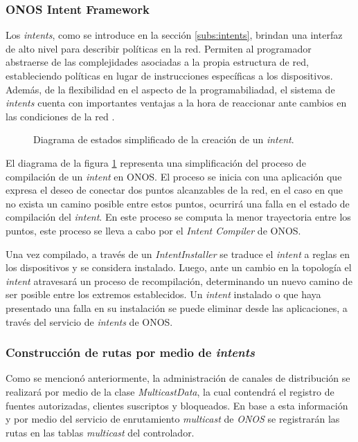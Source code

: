 \subsubsection*{ONOS Intent Framework}
Los \textit{intents}, como se introduce en la sección \ref{subs:intents}, brindan una interfaz de alto nivel para describir políticas en la red. Permiten al programador abstraerse de las complejidades asociadas a la propia estructura de red, estableciendo políticas en lugar de instrucciones específicas a los dispositivos. Además, de la flexibilidad en el aspecto de la programabiliadad, el sistema de \textit{intents} cuenta con importantes ventajas a la hora de reaccionar ante cambios en las condiciones de la red \parencite{onos_intent}. 

\begin{figure}[th]
	\centering 
	\caption[Diagrama de estados simplificado de la creación de un \textit{intent}]{Diagrama de estados simplificado de la creación de un \textit{intent}.}
	\label{fig:intent}
\end{figure}

El diagrama de la figura \ref{fig:intent} representa una simplificación del proceso de compilación de un \textit{intent} en ONOS. El proceso se inicia con una aplicación que expresa el deseo de conectar dos puntos alcanzables de la red, en el caso en que no exista un camino posible entre estos puntos, ocurrirá una falla en el estado de compilación del \textit{intent}. En este proceso se computa la menor trayectoria entre los puntos, este proceso se lleva a cabo por el \textit{Intent Compiler} de ONOS.


Una vez compilado, a través de un \textit{IntentInstaller} se traduce el \textit{intent} a reglas en los dispositivos y se considera instalado. Luego, ante un cambio en la topología el \textit{intent} atravesará un proceso de recompilación, determinando un nuevo camino de ser posible entre los extremos establecidos. Un \textit{intent} instalado o que haya presentado una falla en su instalación se puede eliminar desde las aplicaciones, a través del servicio de \textit{intents} de ONOS.



\subsubsection*{Construcción de rutas por medio de \textit{intents}}

Como se mencionó anteriormente, la administración de canales de distribución se realizará por medio de la clase \textit{MulticastData}, la cual contendrá el registro de fuentes autorizadas, clientes suscriptos y bloqueados. En base a esta información y por medio del servicio de enrutamiento \textit{multicast} de \textit{ONOS} se registrarán las rutas en las tablas \textit{multicast} del controlador. \

